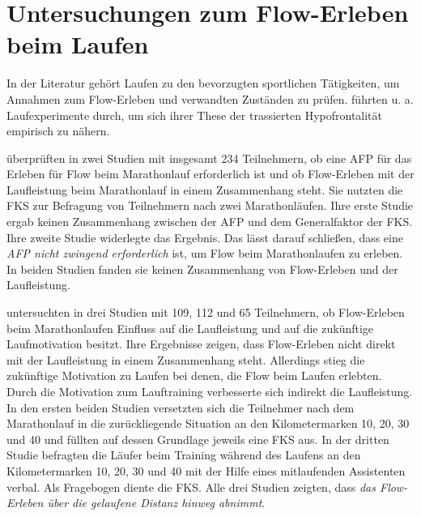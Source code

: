 

\section{Untersuchungen zum Flow-Erleben beim Laufen} 

\label{sec:untersuchungen_zum_flow_erleben_beim_laufen}

In der Literatur gehört Laufen zu den bevorzugten sportlichen Tätigkeiten, um Annahmen zum Flow-Erleben und verwandten Zuständen zu prüfen. \citet{Dietrich2004a} führten u. a. Laufexperimente durch, um sich ihrer These der trassierten Hypofrontalität empirisch zu nähern. 

\citet{Stoll2005} überprüften in zwei Studien mit insgesamt 234 Teilnehmern, ob eine \ac{AFP} für das Erleben für Flow beim Marathonlauf erforderlich ist und ob Flow-Erleben mit der Laufleistung beim Marathonlauf in einem Zusammenhang steht. Sie nutzten die \ac{FKS} zur Befragung von Teilnehmern nach zwei Marathonläufen. Ihre erste Studie ergab keinen Zusammenhang zwischen der \ac{AFP} und dem Generalfaktor der \ac{FKS}. Ihre zweite Studie widerlegte das Ergebnis. Das lässt \citet{Stoll2005} darauf schließen, dass eine \emph{\ac{AFP} nicht zwingend erforderlich} ist, um Flow beim Marathonlaufen zu erleben. In beiden Studien fanden sie keinen Zusammenhang von Flow-Erleben und der Laufleistung. 

\citet{Schuler2009} untersuchten in drei Studien mit 109, 112 und 65 Teilnehmern, ob Flow-Erleben beim Marathonlaufen Einfluss auf die Laufleistung und auf die zukünftige Laufmotivation besitzt. Ihre Ergebnisse zeigen, dass Flow-Erleben nicht direkt mit der Laufleistung in einem Zusammenhang steht. Allerdings stieg die zukünftige Motivation zu Laufen bei denen, die Flow beim Laufen erlebten. Durch die Motivation zum Lauftraining verbesserte sich indirekt die Laufleistung. In den ersten beiden Studien versetzten sich die Teilnehmer nach dem Marathonlauf in die zurückliegende Situation an den Kilometermarken 10, 20, 30 und 40 und füllten auf dessen Grundlage jeweils eine \ac{FKS} aus. In der dritten Studie befragten \citet{Schuler2009} die Läufer beim Training während des Laufens an den Kilometermarken 10, 20, 30 und 40 mit der Hilfe eines mitlaufenden Assistenten verbal. Als Fragebogen diente die \ac{FKS}. Alle drei Studien zeigten, dass \emph{das Flow-Erleben über die gelaufene Distanz hinweg abnimmt}. 

